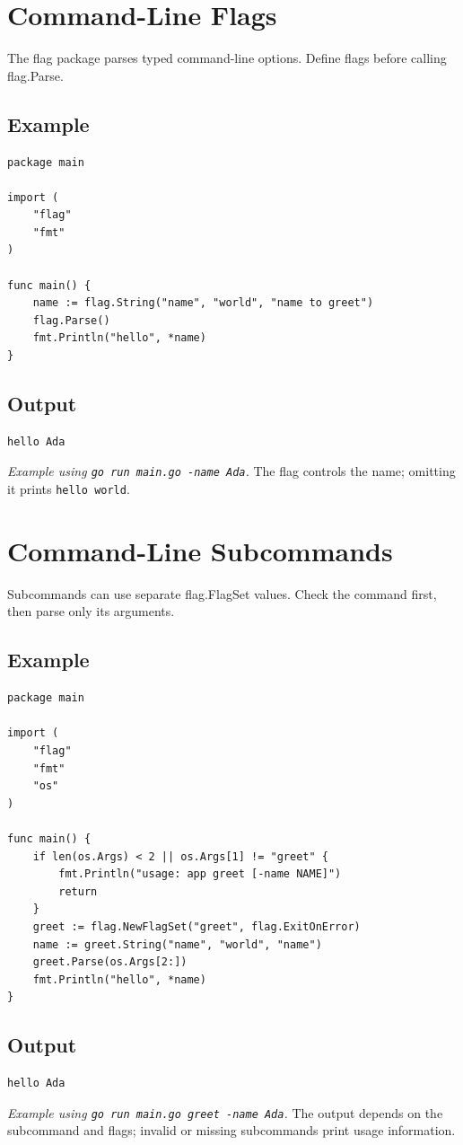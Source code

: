 \documentclass[10pt,oneside]{article}
\newcommand{\sectionline}{\par\vspace{4pt}{\color{rule}\hrule height .5pt}\vspace{7pt}\color{ink}\noindent}
\begin{document}
\section{Command-Line Flags}
\sectionline
The flag package parses typed command-line options. Define flags before calling flag.Parse.\par
\subsection*{Example}
\begin{lstlisting}[style=gocode]
package main

import (
	"flag"
	"fmt"
)

func main() {
	name := flag.String("name", "world", "name to greet")
	flag.Parse()
	fmt.Println("hello", *name)
}
\end{lstlisting}


\subsection*{Output}
\begin{lstlisting}[style=terminal]
hello Ada
\end{lstlisting}
\emph{Example using \texttt{go run main.go -name Ada}.} The flag controls the name; omitting it prints \texttt{hello world}.
\clearpage
\section{Command-Line Subcommands}
\sectionline
Subcommands can use separate flag.FlagSet values. Check the command first, then parse only its arguments.\par
\subsection*{Example}
\begin{lstlisting}[style=gocode]
package main

import (
	"flag"
	"fmt"
	"os"
)

func main() {
	if len(os.Args) < 2 || os.Args[1] != "greet" {
		fmt.Println("usage: app greet [-name NAME]")
		return
	}
	greet := flag.NewFlagSet("greet", flag.ExitOnError)
	name := greet.String("name", "world", "name")
	greet.Parse(os.Args[2:])
	fmt.Println("hello", *name)
}
\end{lstlisting}


\subsection*{Output}
\begin{lstlisting}[style=terminal]
hello Ada
\end{lstlisting}
\emph{Example using \texttt{go run main.go greet -name Ada}.} The output depends on the subcommand and flags; invalid or missing subcommands print usage information.
\clearpage
\end{document}
